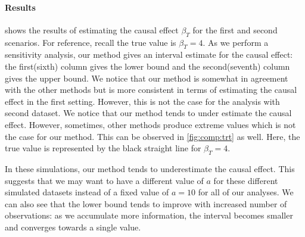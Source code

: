 \documentclass[preprint,12pt]{elsarticle}
\begin{document}
\paragraph{Results}
 shows the results of estimating the causal effect $\beta_T$
for the first and second scenarios.
For reference, recall the true value is $\beta_T=4$. 
As we perform a sensitivity analysis,
our method gives an interval estimate for the causal effect:
the first(sixth) column gives the lower bound
and the second(seventh) column gives the upper bound. We notice that our method is 
somewhat in agreement with the other methods but is more consistent
in terms of estimating the causal effect in the first setting. However, this is not the
case for the analysis with second dataset. We notice that our method tends to under
estimate the causal effect. However, sometimes, other methods produce extreme 
values which is not the case for our method. This can be observed in \cref{fig:comp:trt} as well. Here, the true 
value is represented by the black straight line for $\beta_T = 4$. 

In these simulations, our method tends
to underestimate the causal effect.
This suggests that
we may want to have a different value of $a$ for these different simulated datasets
instead of a fixed value of $a=10$ for all of our analyses.
We can also see that the lower bound tends to improve
with increased number of observations: as we accumulate
more information, the interval becomes smaller and converges towards
a single value.
\end{document}
